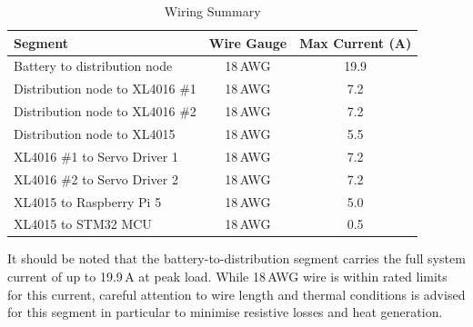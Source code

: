 \begin{table}[h]
    \centering
    \caption{Wiring Summary}
    \label{tab:wiring}
    \begin{tabular}{|l|c|c|}
        \hline
        \textbf{Segment}                  & \textbf{Wire Gauge} & \textbf{Max Current (A)} \\
        \hline
        Battery to distribution node      & 18\,AWG & 19.9 \\
        Distribution node to XL4016 \#1   & 18\,AWG & 7.2  \\
        Distribution node to XL4016 \#2   & 18\,AWG & 7.2  \\
        Distribution node to XL4015       & 18\,AWG & 5.5  \\
        XL4016 \#1 to Servo Driver 1      & 18\,AWG & 7.2  \\
        XL4016 \#2 to Servo Driver 2      & 18\,AWG & 7.2  \\
        XL4015 to Raspberry Pi 5          & 18\,AWG & 5.0  \\
        XL4015 to STM32 MCU               & 18\,AWG & 0.5  \\
        \hline
    \end{tabular}
\end{table}

\noindent It should be noted that the battery-to-distribution segment carries the full system 
current of up to 19.9\,A at peak load. While 18\,AWG wire is within rated limits for this 
current, careful attention to wire length and thermal conditions is advised for this segment 
in particular to minimise resistive losses and heat generation.

